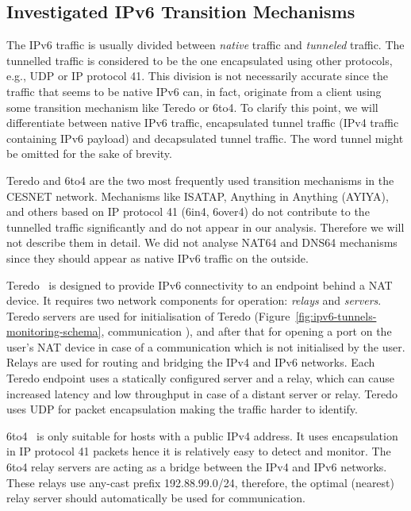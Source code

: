 \subsection{Investigated IPv6 Transition Mechanisms} \label{subsec:ipv6-tunnel-traffic}

The IPv6 traffic is usually divided between \emph{native} traffic and \emph{tunneled} traffic. The tunnelled traffic is considered to be the one encapsulated using other protocols, e.g., UDP or IP protocol 41. This division is not necessarily accurate since the traffic that seems to be native IPv6 can, in fact, originate from a client using some transition mechanism like Teredo or 6to4. To clarify this point, we will differentiate between native IPv6 traffic, encapsulated tunnel traffic (IPv4 traffic containing IPv6 payload) and decapsulated tunnel traffic. The word tunnel might be omitted for the sake of brevity. 

Teredo and 6to4 are the two most frequently used transition mechanisms in the CESNET network. Mechanisms like ISATAP, Anything in Anything (AYIYA), and others based on IP protocol 41 (6in4, 6over4) do not contribute to the tunnelled traffic significantly and do not appear in our analysis. Therefore we will not describe them in detail. We did not analyse NAT64 and DNS64 mechanisms since they should appear as native IPv6 traffic on the outside.

Teredo~\cite{rfc4380} is designed to provide IPv6 connectivity to an endpoint behind a NAT device. It requires two network components for operation: \emph{relays} and \emph{servers}. Teredo servers are used for initialisation of Teredo (Figure~\ref{fig:ipv6-tunnels-monitoring-schema}, communication ), and after that for opening a port on the user's NAT device in case of a communication which is not initialised by the user. Relays are used for routing and bridging the IPv4 and IPv6 networks. Each Teredo endpoint uses a statically configured server and a relay, which can cause increased latency and low throughput in case of a distant server or relay. Teredo uses UDP for packet encapsulation making the traffic harder to identify.

6to4~\cite{rfc3056} is only suitable for hosts with a public IPv4 address. It uses encapsulation in IP protocol 41 packets hence it is relatively easy to detect and monitor. The 6to4 relay servers are acting as a bridge between the IPv4 and IPv6 networks. These relays use any-cast prefix 192.88.99.0/24, therefore, the optimal (nearest) relay server should automatically be used for communication.

